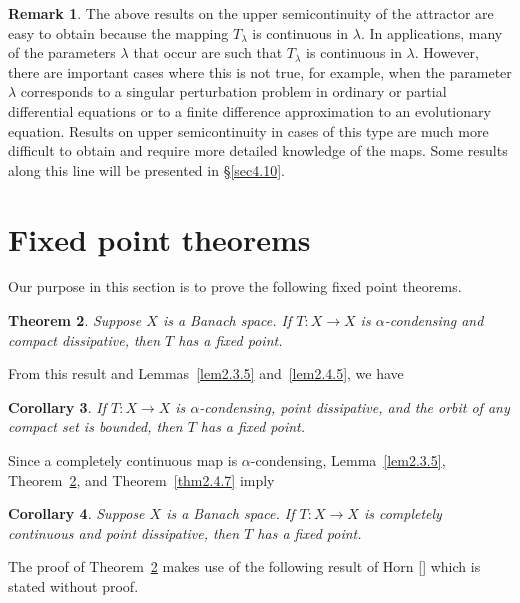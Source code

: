 \documentclass{surv-l}
\theoremstyle{plain}
\newtheorem{theorem}{Theorem}[section]
\newtheorem{corollary}[theorem]{Corollary}
\theoremstyle{definition}
\newtheorem{remark}[theorem]{Remark}
\numberwithin{equation}{section}
\numberwithin{figure}{chapter}
\begin{document}
{\def\thetheorem{2.4.5}
\begin{remark}\label{rem2.4.5} The above results on the upper semicontinuity of the attractor are easy to obtain because the mapping $T_{\lambda}$ is continuous in $\lambda$. In applications, many of the parameters $\lambda$ that occur are such that $T_{\lambda}$ is continuous in $\lambda$. However, there are important cases where this is not true, for example, when the parameter $\lambda$ corresponds to a singular perturbation problem in ordinary or partial differential equations or to a finite difference approximation to an evolutionary equation. Results on upper semicontinuity in cases of this type are much more difficult to obtain and require more detailed knowledge of the maps. Some results along this line will be presented in \S \ref{sec4.10}.
\end{remark}
}
\section{Fixed point theorems}\label{sec2.6}

Our purpose in this section is to prove the following fixed point theorems.

\begin{theorem}\label{thm2.6.1} Suppose $X$ is a Banach space. If $T\!:X\rightarrow X$ is $\alpha$-condensing and compact dissipative, then $T$ has a fixed point.
\end{theorem}

From this result and Lemmas~\ref{lem2.3.5} and~\ref{lem2.4.5}, we have

\begin{corollary}\label{cor2.6.2} If $T\!:X\rightarrow X$ is $\alpha$-condensing, point dissipative, and the orbit of any compact set is bounded, then $T$ has a fixed point.
\end{corollary}

Since a completely continuous map is $\alpha$-condensing, Lemma~\ref{lem2.3.5}, Theorem~\ref{thm2.6.1}, and Theorem~\ref{thm2.4.7} imply

\begin{corollary}\label{cor2.6.3} Suppose $X$ is a Banach space. If $T\!:X\rightarrow X$ is completely continuous and point dissipative, then $T$ has a fixed point.
\end{corollary}

The proof of Theorem~\ref{thm2.6.1} makes use of the following result of Horn [\citeyear{1970h}] which is stated without proof.
\end{document}
